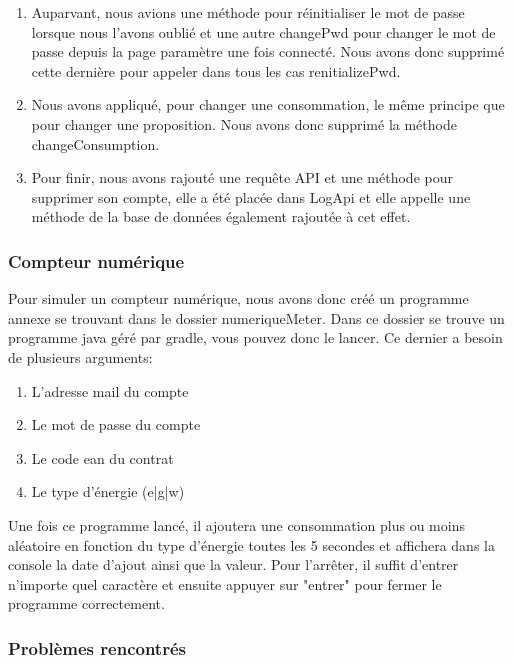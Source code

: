 \begin{enumerate}
\item Auparvant, nous avions une méthode pour réinitialiser le mot de passe lorsque nous l'avons oublié et une autre changePwd pour changer le mot de passe depuis la page paramètre une fois connecté. Nous avons donc supprimé cette dernière pour appeler dans tous les cas renitializePwd.
\item Nous avons appliqué, pour changer une consommation, le même principe que pour changer une proposition. Nous avons donc supprimé la méthode changeConsumption.
\item Pour finir, nous avons rajouté une requête API et une méthode pour supprimer son compte, elle a été placée dans LogApi et elle appelle une méthode de la base de données également rajoutée à cet effet.
\end{enumerate}

\subsubsection{Compteur numérique}

\begin{flushleft}
Pour simuler un compteur numérique, nous avons donc créé un programme annexe se trouvant dans le dossier numeriqueMeter. Dans ce dossier se trouve un programme java géré par gradle, vous pouvez donc le lancer. Ce dernier a besoin de plusieurs arguments:
\end{flushleft}

\begin{enumerate}[-]
\item L'adresse mail du compte
\item Le mot de passe du compte
\item Le code ean du contrat
\item Le type d'énergie (e|g|w)
\end{enumerate}

\begin{flushleft}
Une fois ce programme lancé, il ajoutera une consommation plus ou moins aléatoire en fonction du type d'énergie toutes les 5 secondes et affichera dans la console la date d'ajout ainsi que la valeur. Pour l'arrêter, il suffit d'entrer n'importe quel caractère et ensuite appuyer sur "entrer" pour fermer le programme correctement.
\end{flushleft}

\subsubsection{Problèmes rencontrés}

